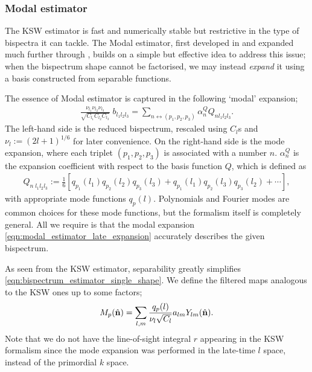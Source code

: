 \subsubsection*{Modal estimator}
The KSW estimator is fast and numerically stable but restrictive in the type of bispectra it can tackle. The Modal estimator, first developed in \cite{Fergusson2010general} and expanded much further through \cite{Fergusson2012,Fergusson2014,Shiraishi2014parityodd,Shiraishi2019cross}, builds on a simple but effective idea to address this issue; when the bispectrum shape cannot be factorised, we may instead \textit{expand} it using a basis constructed from separable functions.

The essence of Modal estimator is captured in the following `modal' expansion;
\begin{align}
	\frac{\nu_{l_1} \nu_{l_2} \nu_{l_3}}{\sqrt{C_{l_1} C_{l_2} C_{l_3}}} \; b_{l_1 l_2 l_3} = \sum_{n \leftrightarrow (p_1,p_2,p_3)} \alpha_n^Q Q_{n l_1 l_2 l_3}. \label{eqn:modal_estimator_late_expansion}
\end{align}
The left-hand side is the reduced bispectrum, rescaled using $C_l$s and $\nu_l := (2l+1)^{1/6}$ for later convenience. On the right-hand side is the mode expansion, where each triplet $(p_1,p_2,p_3)$ is associated with a number $n$. $\alpha_n^Q$ is the expansion coefficient with respect to the basis function $Q$, which is defined as
\begin{align}
	Q_{n \; l_1 l_2 l_3} := \frac{1}{6} \left[ q_{p_1}(l_1) q_{p_2}(l_2) q_{p_3}(l_3) + q_{p_1}(l_1) q_{p_2}(l_3) q_{p_3}(l_2) + \cdots \right],
\end{align}
with appropriate mode functions $q_p(l)$. Polynomials and Fourier modes are common choices for these mode functions, but the formalism itself is completely general. All we require is that the modal expansion \eqref{eqn:modal_estimator_late_expansion} accurately describes the given bispectrum.

As seen from the KSW estimator, separability greatly simplifies \eqref{eqn:bispectrum_estimator_single_shape}. We define the filtered maps analogous to the KSW ones up to some factors;
\begin{align}
	M_p (\hat{\mathbf{n}}) = \sum_{l,m} \frac{q_p(l)}{\nu_l \sqrt{C_l}} a_{lm} Y_{lm}(\hat{\mathbf{n}}). \label{eqn:modal_estimator_filtered_map}
\end{align}
Note that we do not have the line-of-sight integral $r$ appearing in the KSW formalism since the mode expansion was performed in the late-time $l$ space, instead of the primordial $k$ space.

